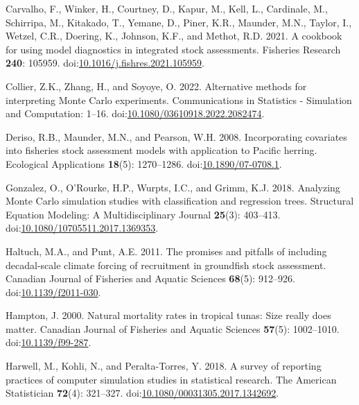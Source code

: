 \documentclass[
  12pt,
]{article}
\newlength{\cslhangindent}
\newenvironment{CSLReferences}[2] %
 {\begin{list}{}{%
  \setlength{\itemindent}{0pt}
  \setlength{\leftmargin}{0pt}
  \setlength{\parsep}{0pt}
  \ifodd #1
   \setlength{\leftmargin}{\cslhangindent}
   \setlength{\itemindent}{-1\cslhangindent}
  \fi
  \setlength{\itemsep}{#2\baselineskip}}}
 {\end{list}}
\begin{document}
\begin{CSLReferences}{1}{0}
Carvalho, F., Winker, H., Courtney, D., Kapur, M., Kell, L., Cardinale,
M., Schirripa, M., Kitakado, T., Yemane, D., Piner, K.R., Maunder, M.N.,
Taylor, I., Wetzel, C.R., Doering, K., Johnson, K.F., and Methot, R.D.
2021. A cookbook for using model diagnostics in integrated stock
assessments. Fisheries Research \textbf{240}: 105959.
doi:\href{https://doi.org/10.1016/j.fishres.2021.105959}{10.1016/j.fishres.2021.105959}.

Collier, Z.K., Zhang, H., and Soyoye, O. 2022. Alternative methods for
interpreting {M}onte {C}arlo experiments. Communications in Statistics -
Simulation and Computation: 1--16.
doi:\href{https://doi.org/10.1080/03610918.2022.2082474}{10.1080/03610918.2022.2082474}.

Deriso, R.B., Maunder, M.N., and Pearson, W.H. 2008. Incorporating
covariates into fisheries stock assessment models with application to
{P}acific herring. Ecological Applications \textbf{18}(5): 1270--1286.
doi:\href{https://doi.org/10.1890/07-0708.1}{10.1890/07-0708.1}.

Gonzalez, O., O'Rourke, H.P., Wurpts, I.C., and Grimm, K.J. 2018.
Analyzing {M}onte {C}arlo simulation studies with classification and
regression trees. Structural Equation Modeling: A Multidisciplinary
Journal \textbf{25}(3): 403--413.
doi:\href{https://doi.org/10.1080/10705511.2017.1369353}{10.1080/10705511.2017.1369353}.

Haltuch, M.A., and Punt, A.E. 2011. The promises and pitfalls of
including decadal-scale climate forcing of recruitment in groundfish
stock assessment. Canadian Journal of Fisheries and Aquatic Sciences
\textbf{68}(5): 912--926.
doi:\href{https://doi.org/10.1139/f2011-030}{10.1139/f2011-030}.

Hampton, J. 2000. Natural mortality rates in tropical tunas: Size really
does matter. Canadian Journal of Fisheries and Aquatic Sciences
\textbf{57}(5): 1002--1010.
doi:\href{https://doi.org/10.1139/f99-287}{10.1139/f99-287}.

Harwell, M., Kohli, N., and Peralta-Torres, Y. 2018. A survey of
reporting practices of computer simulation studies in statistical
research. The American Statistician \textbf{72}(4): 321--327.
doi:\href{https://doi.org/10.1080/00031305.2017.1342692}{10.1080/00031305.2017.1342692}.


\end{CSLReferences}
\end{document}
